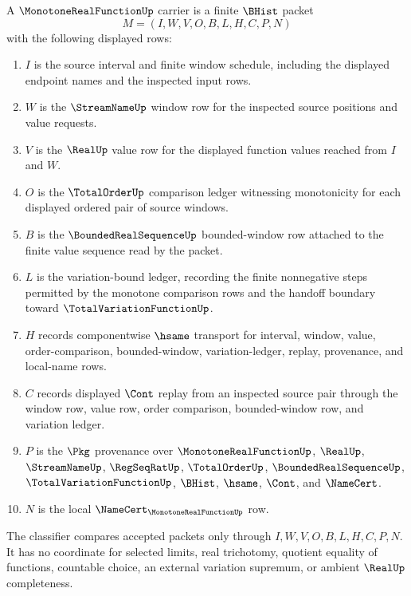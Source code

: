 \begin{definition}
\label{def:monotone-real-function-carrier}
A $\MonotoneRealFunctionUp$ carrier is a finite $\BHist$ packet
$$
M=(I,W,V,O,B,L,H,C,P,N)
$$
with the following displayed rows:
\begin{enumerate}
\item $I$ is the source interval and finite window schedule, including the displayed endpoint names and the inspected input rows.
\item $W$ is the $\StreamNameUp$ window row for the inspected source positions and value requests.
\item $V$ is the $\RealUp$ value row for the displayed function values reached from $I$ and $W$.
\item $O$ is the $\TotalOrderUp$ comparison ledger witnessing monotonicity for each displayed ordered pair of source windows.
\item $B$ is the $\BoundedRealSequenceUp$ bounded-window row attached to the finite value sequence read by the packet.
\item $L$ is the variation-bound ledger, recording the finite nonnegative steps permitted by the monotone comparison rows and the handoff boundary toward $\TotalVariationFunctionUp$.
\item $H$ records componentwise $\hsame$ transport for interval, window, value, order-comparison, bounded-window, variation-ledger, replay, provenance, and local-name rows.
\item $C$ records displayed $\Cont$ replay from an inspected source pair through the window row, value row, order comparison, bounded-window row, and variation ledger.
\item $P$ is the $\Pkg$ provenance over $\MonotoneRealFunctionUp$, $\RealUp$, $\StreamNameUp$, $\RegSeqRatUp$, $\TotalOrderUp$, $\BoundedRealSequenceUp$, $\TotalVariationFunctionUp$, $\BHist$, $\hsame$, $\Cont$, and $\NameCert$.
\item $N$ is the local $\NameCert_{\MonotoneRealFunctionUp}$ row.
\end{enumerate}
The classifier compares accepted packets only through $I,W,V,O,B,L,H,C,P,N$. It has no coordinate for selected limits, real trichotomy, quotient equality of functions, countable choice, an external variation supremum, or ambient $\RealUp$ completeness.
\end{definition}

